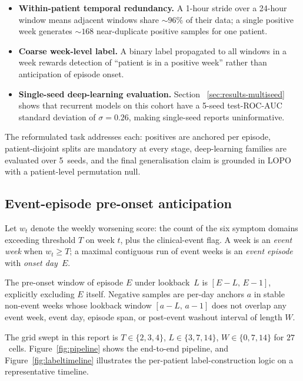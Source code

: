 \documentclass[11pt,a4paper]{article}
\newcommand{\rocauc}{ROC\nobreakdash-AUC}
\begin{document}
\begin{itemize}[nosep,leftmargin=*]
  \item \textbf{Within-patient temporal redundancy.}  A 1-hour stride
        over a 24-hour window means adjacent windows share ${\sim}96\%$
        of their data; a single positive week generates ${\sim}168$
        near-duplicate positive samples for one patient.
  \item \textbf{Coarse week-level label.}  A binary label propagated
        to all windows in a week rewards detection of ``patient is in
        a positive week'' rather than anticipation of episode onset.
  \item \textbf{Single-seed deep-learning evaluation.}  Section~%
        \ref{sec:results-multiseed} shows that recurrent models on this
        cohort have a 5-seed test-\rocauc{} standard deviation of
        $\sigma=0.26$, making single-seed reports uninformative.
\end{itemize}

The reformulated task addresses each: positives are anchored per
episode, patient-disjoint splits are mandatory at every stage,
deep-learning families are evaluated over 5~seeds, and the final
generalisation claim is grounded in LOPO with a patient-level
permutation null.

\subsection{Event-episode pre-onset anticipation}\label{sec:method-task}

Let $w_t$ denote the weekly worsening score: the count of the six
symptom domains exceeding threshold $T$ on week $t$, plus the
clinical-event flag.  A week is an \emph{event week} when $w_t\geq T$;
a maximal contiguous run of event weeks is an \emph{event episode}
with \emph{onset day}~$E$.

The pre-onset window of episode $E$ under lookback~$L$ is
$[E-L,\,E-1]$, explicitly excluding $E$ itself.  Negative samples are
per-day anchors $a$ in stable non-event weeks whose lookback window
$[a-L,\,a-1]$ does not overlap any event week, event day, episode
span, or post-event washout interval of length $W$.

The grid swept in this report is $T\in\{2,3,4\}$, $L\in\{3,7,14\}$,
$W\in\{0,7,14\}$ for $27$~cells.  Figure~\ref{fig:pipeline} shows the
end-to-end pipeline, and Figure~\ref{fig:labeltimeline} illustrates the
per-patient label-construction logic on a representative timeline.
\end{document}
